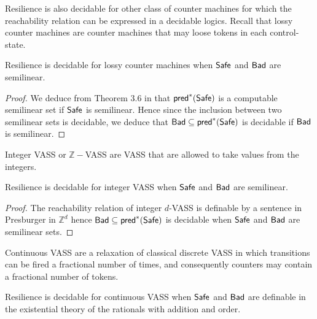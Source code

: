 Resilience is also decidable for other class of counter machines for which the reachability relation can be expressed in a decidable logics. Recall that lossy counter machines \cite{DBLP:conf/rp/Schnoebelen10} are counter machines that may loose tokens in each control-state.

\begin{theorem}{}
Resilience is decidable for lossy counter machines when $\textsf{Safe}$ and $\textsf{Bad}$ are semilinear.
\end{theorem}

\begin{proof}
We deduce from Theorem 3.6 in \cite{DBLP:conf/rp/Schnoebelen10} that $\textsf{pred}^*(\textsf{Safe})$ is a computable semilinear set if $\textsf{Safe}$ is semilinear. Hence since the inclusion between two semilinear sets is decidable, we deduce that $\textsf{Bad} \subseteq \textsf{pred}^*(\textsf{Safe})$ is decidable if $\textsf{Bad}$ is semilinear.
\end{proof}

Integer VASS or $\mathbb{Z}-$VASS \cite{DBLP:conf/rp/HaaseH14} are VASS that are allowed to take values from the integers.

\begin{theorem}{}
Resilience is decidable for integer VASS when $\textsf{Safe}$ and $\textsf{Bad}$ are semilinear.
\end{theorem}

\begin{proof}
The reachability relation of integer $d$-VASS is definable by a sentence in Presburger in $\mathbb{Z}^d$ hence	$\textsf{Bad} \subseteq \textsf{pred}^*(\textsf{Safe})$ is decidable when $\textsf{Safe}$ and $\textsf{Bad}$ are semilinear sets.
\end{proof}

Continuous VASS \cite{DBLP:journals/tocl/BlondinFHH17} are a relaxation of classical discrete VASS in which transitions can be fired a fractional number of times, and consequently counters may contain a fractional number of tokens.

\begin{theorem}\label{RP VASS}
Resilience is decidable for continuous VASS when $\textsf{Safe}$ and $\textsf{Bad}$ are definable in the existential theory of
the rationals with addition and order.
\end{theorem}

